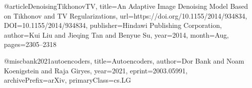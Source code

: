 @article{DenoisingTikhonovTV,
	title={An Adaptive Image Denoising Model Based on Tikhonov and TV Regularizations},
	url={https://doi.org/10.1155/2014/934834},
	DOI={10.1155/2014/934834},
	publisher={Hindawi Publishing Corporation},
	author={Kui Liu and Jieqing Tan and Benyue Su},
	year={2014},
	month={Aug},
	pages={2305–2318}
}

@misc{bank2021autoencoders,
	title={Autoencoders}, 
	author={Dor Bank and Noam Koenigstein and Raja Giryes},
	year={2021},
	eprint={2003.05991},
	archivePrefix={arXiv},
	primaryClass={cs.LG}
}
